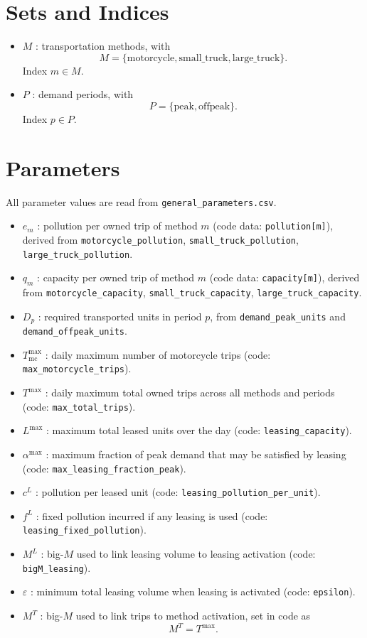 \section*{Sets and Indices}

\begin{itemize}
    \item $M$ : transportation methods, with
    \[
    M=\{\text{motorcycle},\text{small\_truck},\text{large\_truck}\}.
    \]
    Index $m \in M$.
    \item $P$ : demand periods, with
    \[
    P=\{\text{peak},\text{offpeak}\}.
    \]
    Index $p \in P$.
\end{itemize}

\section*{Parameters}

All parameter values are read from \texttt{general\_parameters.csv}.

\begin{itemize}
    \item $e_m$ : pollution per owned trip of method $m$ (code data: \texttt{pollution[m]}), derived from
    \texttt{motorcycle\_pollution}, \texttt{small\_truck\_pollution}, \texttt{large\_truck\_pollution}.
    \item $q_m$ : capacity per owned trip of method $m$ (code data: \texttt{capacity[m]}), derived from
    \texttt{motorcycle\_capacity}, \texttt{small\_truck\_capacity}, \texttt{large\_truck\_capacity}.
    \item $D_p$ : required transported units in period $p$, from
    \texttt{demand\_peak\_units} and \texttt{demand\_offpeak\_units}.
    \item $T^{\max}_{\mathrm{mc}}$ : daily maximum number of motorcycle trips (code: \texttt{max\_motorcycle\_trips}).
    \item $T^{\max}$ : daily maximum total owned trips across all methods and periods (code: \texttt{max\_total\_trips}).
    \item $L^{\max}$ : maximum total leased units over the day (code: \texttt{leasing\_capacity}).
    \item $\alpha^{\max}$ : maximum fraction of peak demand that may be satisfied by leasing (code: \texttt{max\_leasing\_fraction\_peak}).
    \item $c^{L}$ : pollution per leased unit (code: \texttt{leasing\_pollution\_per\_unit}).
    \item $f^{L}$ : fixed pollution incurred if any leasing is used (code: \texttt{leasing\_fixed\_pollution}).
    \item $M^{L}$ : big-$M$ used to link leasing volume to leasing activation (code: \texttt{bigM\_leasing}).
    \item $\varepsilon$ : minimum total leasing volume when leasing is activated (code: \texttt{epsilon}).
    \item $M^{T}$ : big-$M$ used to link trips to method activation, set in code as
    \[
    M^{T}=T^{\max}.
    \]
\end{itemize}

